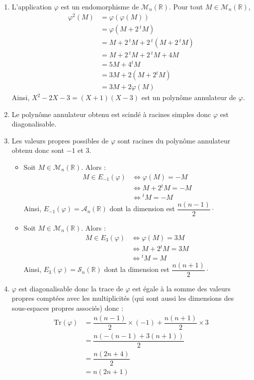 \documentclass[a4paper,10pt]{report}
\begin{document}
\begin{enumerate}
\item L'application $\varphi$ est un endomorphisme de $\mathcal{M}_n(\mathbb{R})$. Pour tout $M \in \mathcal{M}_n(\mathbb{R})$,
\begin{align*}
\varphi^2(M) & = \varphi(\varphi(M)) \\
& =  \varphi(M +2 \, {}^t M) \\
& = M +2 \, {}^t M +2 \, {}^t (M +2 \, {}^t M) \\
& = M +2 \, {}^t M +2 \, {}^t M +4M \\
& = 5M + 4{}^t M \\
& = 3M + 2(M +2{}^t M) \\
& = 3M + 2\varphi(M)
\end{align*}
Ainsi, $X^2-2X-3=(X+1)(X-3)$ est un polynôme annulateur de $\varphi$.
\item Le polynôme annulateur obtenu est scindé à racines simples donc $\varphi$ est diagonalisable.
\item Les valeurs propres possibles de $\varphi$ sont racines du polynôme annulateur obtenu donc sont $-1$ et $3$.
\begin{itemize}
\item Soit $M \in \mathcal{M}_n(\mathbb{R})$. Alors :
\begin{align*}
M \in E_{-1}(\varphi) & \Longleftrightarrow \varphi(M)=-M \\
& \Longleftrightarrow M +2{}^t M = -M \\
& \Longleftrightarrow {}^t M= - M 
\end{align*}
Ainsi, $E_{-1}(\varphi) = \mathcal{A}_n(\mathbb{R})$ dont la dimension est $\dfrac{n(n-1)}{2} \cdot$
\item Soit $M \in \mathcal{M}_n(\mathbb{R})$. Alors :
\begin{align*}
M \in E_{3}(\varphi) & \Longleftrightarrow \varphi(M)=3M \\
& \Longleftrightarrow M +2{}^t M = 3M \\
& \Longleftrightarrow {}^t M=  M 
\end{align*}
Ainsi, $E_{3}(\varphi) = \mathcal{S}_n(\mathbb{R})$ dont la dimension est $\dfrac{n(n+1)}{2}\cdot$
\end{itemize}

\item $\varphi$ est diagonalisable donc la trace de $\varphi$ est égale à la somme des valeurs propres comptées avec les multiplicités (qui sont aussi les dimensions des sous-espaces propres associés) donc :
\begin{align*}
\textrm{Tr}(\varphi)& = \dfrac{n(n-1)}{2} \times (-1) + \dfrac{n(n+1)}{2} \times 3  \\
& = \dfrac{n(-(n-1)+3(n+1))}{2} \\
& = \dfrac{n(2n+4)}{2} \\
& = n(2n+1) 
\end{align*}
\end{enumerate}
\end{document}
